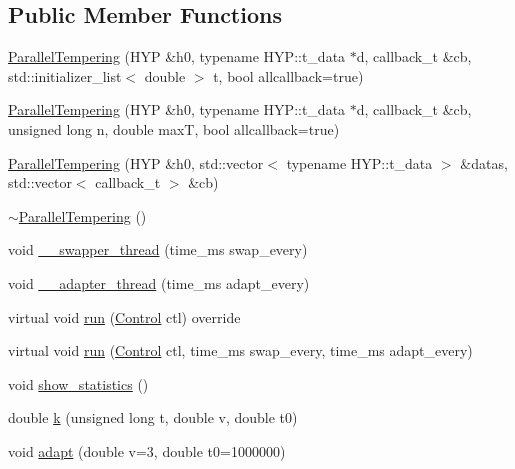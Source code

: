 \subsection*{Public Member Functions}
\begin{DoxyCompactItemize}
\item 
\hyperlink{class_parallel_tempering_abac520918d0d6915c61d9595a82b01eb}{Parallel\+Tempering} (H\+YP \&h0, typename H\+Y\+P\+::t\+\_\+data $\ast$d, callback\+\_\+t \&cb, std\+::initializer\+\_\+list$<$ double $>$ t, bool allcallback=true)
\item 
\hyperlink{class_parallel_tempering_a6318b222a7fbc7148ce82d0bbc5a3ecd}{Parallel\+Tempering} (H\+YP \&h0, typename H\+Y\+P\+::t\+\_\+data $\ast$d, callback\+\_\+t \&cb, unsigned long n, double maxT, bool allcallback=true)
\item 
\hyperlink{class_parallel_tempering_ad4b72862bcc821fe725ac2248c150898}{Parallel\+Tempering} (H\+YP \&h0, std\+::vector$<$ typename H\+Y\+P\+::t\+\_\+data $>$ \&datas, std\+::vector$<$ callback\+\_\+t $>$ \&cb)
\item 
\hyperlink{class_parallel_tempering_a96763c107a95f4a120f2b65c896cb5b2}{$\sim$\+Parallel\+Tempering} ()
\item 
void \hyperlink{class_parallel_tempering_aa704d462a41cb45b461b967a97dedcbb}{\+\_\+\+\_\+swapper\+\_\+thread} (time\+\_\+ms swap\+\_\+every)
\item 
void \hyperlink{class_parallel_tempering_a6ae6bd8581ec13aad5983886b1a739e6}{\+\_\+\+\_\+adapter\+\_\+thread} (time\+\_\+ms adapt\+\_\+every)
\item 
virtual void \hyperlink{class_parallel_tempering_a6824837893cf52eb1cac362e78e483b9}{run} (\hyperlink{struct_control}{Control} ctl) override
\item 
virtual void \hyperlink{class_parallel_tempering_a40df4781b1d06acff7b0902c4d4a5a87}{run} (\hyperlink{struct_control}{Control} ctl, time\+\_\+ms swap\+\_\+every, time\+\_\+ms adapt\+\_\+every)
\item 
void \hyperlink{class_parallel_tempering_a9e1960158b12a4dadfab54eb4fb895d3}{show\+\_\+statistics} ()
\item 
double \hyperlink{class_parallel_tempering_a439c50d3f616319803d4ab83804d1ae0}{k} (unsigned long t, double v, double t0)
\item 
void \hyperlink{class_parallel_tempering_a673feff316b65cad63f56ceb81b128ae}{adapt} (double v=3, double t0=1000000)
\end{DoxyCompactItemize}
